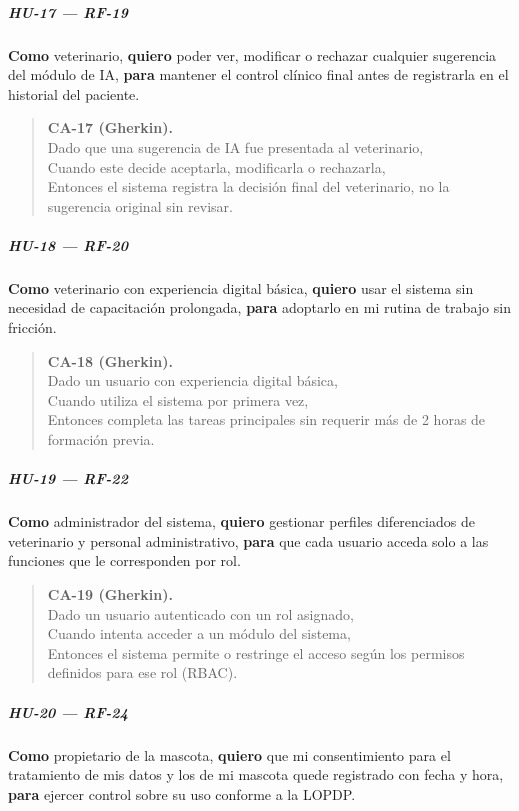 \documentclass[
]{article}
\begin{document}
\subparagraph{HU-17 --- RF-19}
\textbf{Como} veterinario,
\textbf{quiero} poder ver, modificar o rechazar cualquier sugerencia del módulo de IA,
\textbf{para} mantener el control clínico final antes de registrarla en el historial del paciente.

\begin{quote}
\textbf{CA-17 (Gherkin).} \\
Dado que una sugerencia de IA fue presentada al veterinario, \\
Cuando este decide aceptarla, modificarla o rechazarla, \\
Entonces el sistema registra la decisión final del veterinario, no la sugerencia original sin revisar.
\end{quote}

\subparagraph{HU-18 --- RF-20}
\textbf{Como} veterinario con experiencia digital básica,
\textbf{quiero} usar el sistema sin necesidad de capacitación prolongada,
\textbf{para} adoptarlo en mi rutina de trabajo sin fricción.

\begin{quote}
\textbf{CA-18 (Gherkin).} \\
Dado un usuario con experiencia digital básica, \\
Cuando utiliza el sistema por primera vez, \\
Entonces completa las tareas principales sin requerir más de 2 horas de formación previa.
\end{quote}

\subparagraph{HU-19 --- RF-22}
\textbf{Como} administrador del sistema,
\textbf{quiero} gestionar perfiles diferenciados de veterinario y personal administrativo,
\textbf{para} que cada usuario acceda solo a las funciones que le corresponden por rol.

\begin{quote}
\textbf{CA-19 (Gherkin).} \\
Dado un usuario autenticado con un rol asignado, \\
Cuando intenta acceder a un módulo del sistema, \\
Entonces el sistema permite o restringe el acceso según los permisos definidos para ese rol (RBAC).
\end{quote}

\subparagraph{HU-20 --- RF-24}
\textbf{Como} propietario de la mascota,
\textbf{quiero} que mi consentimiento para el tratamiento de mis datos y los de mi mascota quede registrado con fecha y hora,
\textbf{para} ejercer control sobre su uso conforme a la LOPDP.
\end{document}
